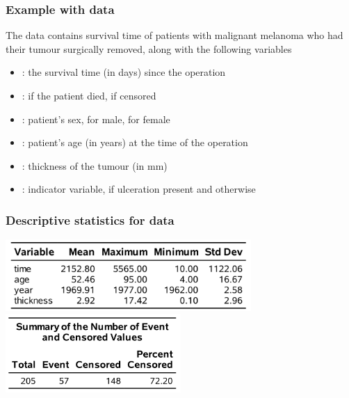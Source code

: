\documentclass{beamer}
\begin{document}
\begin{frame}
\frametitle{Example with  data}
The  data contains survival time of patients with malignant melanoma who had their tumour surgically removed, along with the following variables


{ \footnotesize
\begin{itemize}
\itemsep0em 
\item {}: the survival time (in days) since the operation
\item {}:  if the patient died,  if censored
\item {}: patient's sex,  for male,  for female
\item {}: patient's age (in years) at the time of the operation
\item {}: thickness  of the tumour (in mm)
\item {}: indicator variable,  if ulceration present and  otherwise
\end{itemize}
}

\end{frame}

\begin{frame}
\frametitle{Descriptive statistics for   data}
\begin{center}
\includegraphics[width = 0.7\textwidth]{img/c7/slides7e10}
\includegraphics[width = 0.5\textwidth]{img/c7/slides7e11}
\end{center}
\end{frame}
\end{document}
